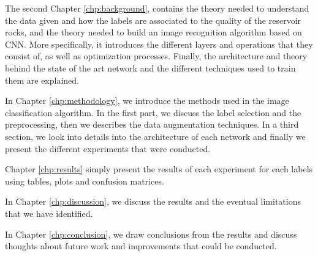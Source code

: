 The second Chapter \ref{chp:background}, contains the theory needed to understand the data given and how the labels are associated to the quality of the reservoir rocks, and the theory needed to build an image recognition algorithm based on CNN. More specifically, it introduces the different layers and operations that they consist of, as well as optimization processes. Finally, the architecture and theory behind the state of the art network and the different techniques used to train them are explained.
 

In Chapter \ref{chp:methodology}, we introduce the methods used in the image classification algorithm. In the first part, we discuss the label selection and the preprocessing, then we describes the data augmentation techniques. In a third section, we look into details into the architecture of each network and finally we present the different experiments that were conducted.  


Chapter  \ref{chp:results} simply present the results of each experiment for each labels using tables, plots and confusion matrices.


In Chapter \ref{chp:discussion}, we discuss the results and the eventual limitations that we have identified.


In Chapter \ref{chp:conclusion}, we draw conclusions from the results and discuss thoughts about future work and improvements that could be conducted. 

